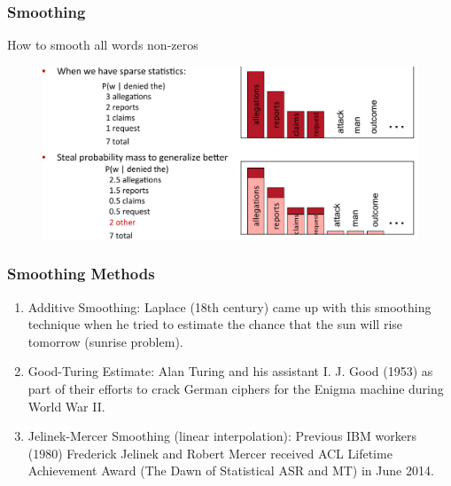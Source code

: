 \documentclass{beamer}
\begin{document}
\begin{frame}\frametitle{Smoothing}

\begin{block}{How to smooth all words non-zeros}

\begin{figure}
\includegraphics[width=0.9\linewidth]{figure/smoothing.pdf}
\label{fig:smoothing}
\end{figure}
\end{block}
\end{frame}



\begin{frame}\frametitle{Smoothing Methods}

\begin{enumerate}
\item Additive Smoothing:  Laplace (18th century) came up with this smoothing
  technique when he tried to estimate the chance that the sun will
  rise tomorrow (sunrise problem).  
\item Good-Turing Estimate: Alan Turing and his assistant I. J. Good
  (1953) as part of their efforts to crack German ciphers for the Enigma
 machine during World War II. 

\item Jelinek-Mercer Smoothing (linear interpolation):  Previous IBM workers
  (1980) Frederick Jelinek and Robert Mercer received ACL Lifetime
  Achievement Award (The Dawn of Statistical ASR and MT) in June 2014.  

\end{enumerate}

\end{frame}
\end{document}
